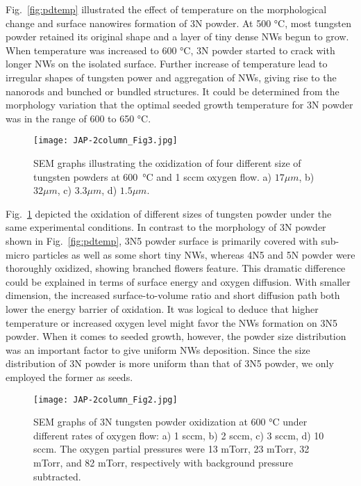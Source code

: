 Fig.~\ref{fig:pdtemp} illustrated the effect of temperature on the morphological change and surface nanowires formation of 3N powder. At 500 \si{\degreeCelsius}, most tungsten powder retained its original shape and a layer of tiny dense NWs begun to grow. When temperature was increased to 600 \si{\degreeCelsius}, 3N powder started to crack with longer NWs on the isolated surface. Further increase of temperature lead to irregular shapes of tungsten power and aggregation of NWs, giving rise to the nanorods and bunched or bundled structures. It could be determined from the morphology variation that the optimal seeded growth temperature for 3N powder was in the range of 600 to 650 \si{\degreeCelsius}.
\begin{figure}[htb]
\centering
\texttt{[image: JAP-2column\_Fig3.jpg]}
\caption[W powder oxidation: size effect]{SEM graphs illustrating the oxidization of four different size of tungsten powders at 600~\si{\degreeCelsius} and 1 sccm oxygen flow. a) $17\mu m$, b) $32\mu m$, c) $3.3\mu m$, d) $1.5\mu m$.}
\label{fig:pdsize}
\end{figure}

Fig.~\ref{fig:pdsize} depicted the oxidation of different sizes of tungsten powder under the same experimental conditions. In contrast to the morphology of 3N powder shown in Fig.~\ref{fig:pdtemp}, 3N5 powder surface is primarily covered with sub-micro particles as well as some short tiny NWs, whereas 4N5 and 5N powder were thoroughly oxidized, showing branched flowers feature. This dramatic difference could be explained in terms of surface energy and oxygen diffusion. With smaller dimension, the increased surface-to-volume ratio and short diffusion path both lower the energy barrier of oxidation.\cite{tungsten1999} It was logical to deduce that higher temperature or increased oxygen level might favor the NWs formation on 3N5 powder. When it comes to seeded growth, however, the powder size distribution was an important factor to give uniform NWs deposition. Since the size distribution of 3N powder is more uniform than that of 3N5 powder, we only employed the former as seeds.
\begin{figure}[htb]
\centering
\texttt{[image: JAP-2column\_Fig2.jpg]}
\caption[W powder oxidation: oxygen pressure]{SEM graphs of 3N tungsten powder oxidization at 600 \si{\degreeCelsius} under different rates of oxygen flow: a) 1 sccm, b) 2 sccm, c) 3 sccm, d) 10 sccm. The oxygen partial pressures were 13 mTorr, 23 mTorr, 32 mTorr, and 82 mTorr, respectively with background pressure subtracted.}
\label{fig:pdoxy}
\end{figure}

